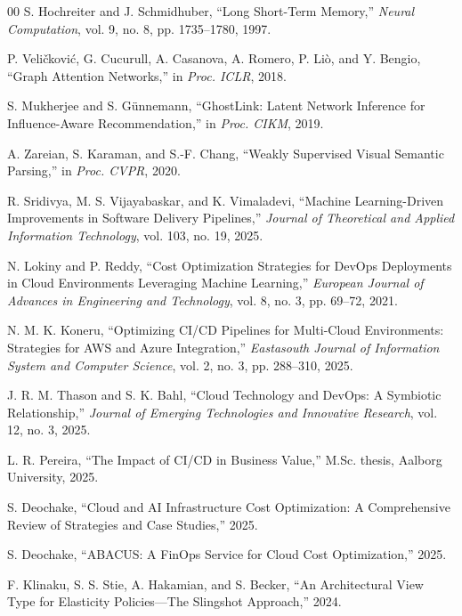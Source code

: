 \documentclass[10pt,twocolumn]{article}
\begin{document}
\begingroup
\raggedright
\begin{thebibliography}{00}
S. Hochreiter and J. Schmidhuber, ``Long Short-Term Memory,'' \emph{Neural Computation}, vol. 9, no. 8, pp. 1735--1780, 1997.

P. Veli\v{c}kovi\'c, G. Cucurull, A. Casanova, A. Romero, P. Li\`o, and Y. Bengio, ``Graph Attention Networks,'' in \emph{Proc. ICLR}, 2018.

S. Mukherjee and S. G\"unnemann, ``GhostLink: Latent Network Inference for Influence-Aware Recommendation,'' in \emph{Proc. CIKM}, 2019.

A. Zareian, S. Karaman, and S.-F. Chang, ``Weakly Supervised Visual Semantic Parsing,'' in \emph{Proc. CVPR}, 2020.

R. Sridivya, M. S. Vijayabaskar, and K. Vimaladevi, ``Machine Learning-Driven Improvements in Software Delivery Pipelines,'' \emph{Journal of Theoretical and Applied Information Technology}, vol. 103, no. 19, 2025.

N. Lokiny and P. Reddy, ``Cost Optimization Strategies for DevOps Deployments in Cloud Environments Leveraging Machine Learning,'' \emph{European Journal of Advances in Engineering and Technology}, vol. 8, no. 3, pp. 69--72, 2021.

N. M. K. Koneru, ``Optimizing CI/CD Pipelines for Multi-Cloud Environments: Strategies for AWS and Azure Integration,'' \emph{Eastasouth Journal of Information System and Computer Science}, vol. 2, no. 3, pp. 288--310, 2025.

J. R. M. Thason and S. K. Bahl, ``Cloud Technology and DevOps: A Symbiotic Relationship,'' \emph{Journal of Emerging Technologies and Innovative Research}, vol. 12, no. 3, 2025.

L. R. Pereira, ``The Impact of CI/CD in Business Value,'' M.Sc. thesis, Aalborg University, 2025.

S. Deochake, ``Cloud and AI Infrastructure Cost Optimization: A Comprehensive Review of Strategies and Case Studies,'' 2025.

S. Deochake, ``ABACUS: A FinOps Service for Cloud Cost Optimization,'' 2025.

F. Klinaku, S. S. Stie, A. Hakamian, and S. Becker, ``An Architectural View Type for Elasticity Policies---The Slingshot Approach,'' 2024.


\end{thebibliography}
\end{document}
